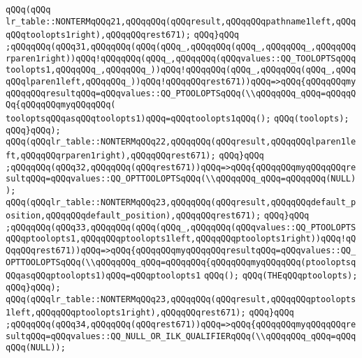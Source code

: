 \verb|qQQq(qQQq|\newline
\verb|lr_table::NONTERMqQQq21,qQQqqQQq(qQQqresult,qQQqqQQqpathname1left,qQQqqQQqtoolopts1right),qQQqqQQqrest671);|\newline
\verb|qQQq}qQQq|\newline
\verb|;qQQqqQQq(qQQq31,qQQqqQQq(qQQq(qQQq_,qQQqqQQq(qQQq_,qQQqqQQq_,qQQqqQQqrparen1right))qQQq!qQQqqQQq(qQQq_,qQQqqQQq(qQQqvalues::QQ_TOOLOPTSqQQqtoolopts1,qQQqqQQq_,qQQqqQQq_))qQQq!qQQqqQQq(qQQq_,qQQqqQQq(qQQq_,qQQqqQQqlparen1left,qQQqqQQq_))qQQq!qQQqqQQqrest671))qQQq=>qQQq{qQQqqQQqmyqQQqqQQqresultqQQq=qQQqvalues::QQ_PTOOLOPTSqQQq(\\qQQqqQQq_qQQq=qQQqqQQq{qQQqqQQqmyqQQqqQQq(|\newline
\verb|tooloptsqQQqasqQQqtoolopts1)qQQq=qQQqtoolopts1qQQq();|\newline
\verb|qQQq(toolopts);|\newline
\verb|qQQq}qQQq);|\newline
\verb|qQQq(qQQqlr_table::NONTERMqQQq22,qQQqqQQq(qQQqresult,qQQqqQQqlparen1left,qQQqqQQqrparen1right),qQQqqQQqrest671);|\newline
\verb|qQQq}qQQq|\newline
\verb|;qQQqqQQq(qQQq32,qQQqqQQq(qQQqrest671))qQQq=>qQQq{qQQqqQQqmyqQQqqQQqresultqQQq=qQQqvalues::QQ_OPTTOOLOPTSqQQq(\\qQQqqQQq_qQQq=qQQqqQQq(NULL));|\newline
\verb|qQQq(qQQqlr_table::NONTERMqQQq23,qQQqqQQq(qQQqresult,qQQqqQQqdefault_position,qQQqqQQqdefault_position),qQQqqQQqrest671);|\newline
\verb|qQQq}qQQq|\newline
\verb|;qQQqqQQq(qQQq33,qQQqqQQq(qQQq(qQQq_,qQQqqQQq(qQQqvalues::QQ_PTOOLOPTSqQQqptoolopts1,qQQqqQQqptoolopts1left,qQQqqQQqptoolopts1right))qQQq!qQQqqQQqrest671))qQQq=>qQQq{qQQqqQQqmyqQQqqQQqresultqQQq=qQQqvalues::QQ_OPTTOOLOPTSqQQq(\\qQQqqQQq_qQQq=qQQqqQQq{qQQqqQQqmyqQQqqQQq(ptooloptsqQQqasqQQqptoolopts1)qQQq=qQQqptoolopts1|\newline
\verb|qQQq();|\newline
\verb|qQQq(THEqQQqptoolopts);|\newline
\verb|qQQq}qQQq);|\newline
\verb|qQQq(qQQqlr_table::NONTERMqQQq23,qQQqqQQq(qQQqresult,qQQqqQQqptoolopts1left,qQQqqQQqptoolopts1right),qQQqqQQqrest671);|\newline
\verb|qQQq}qQQq|\newline
\verb|;qQQqqQQq(qQQq34,qQQqqQQq(qQQqrest671))qQQq=>qQQq{qQQqqQQqmyqQQqqQQqresultqQQq=qQQqvalues::QQ_NULL_OR_ILK_QUALIFIERqQQq(\\qQQqqQQq_qQQq=qQQqqQQq(NULL));|\newline
